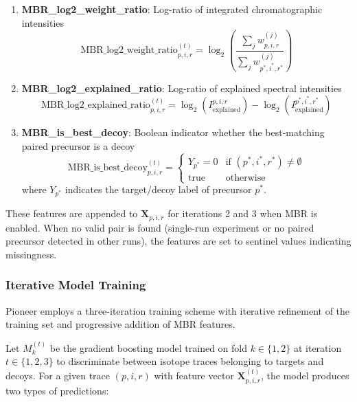 \documentclass[pdflatex,sn-nature]{sn-jnl}
\begin{document}
\begin{enumerate}
\item \textbf{MBR\_log2\_weight\_ratio}: Log-ratio of integrated chromatographic intensities
\begin{equation}
    \text{MBR\_log2\_weight\_ratio}_{p,i,r}^{(t)} = \log_2\left(\frac{\sum_j w_{p,i,r}^{(j)}}{\sum_j w_{p^*,i^*,r^*}^{(j)}}\right)
\end{equation}

\item \textbf{MBR\_log2\_explained\_ratio}: Log-ratio of explained spectral intensities
\begin{equation}
    \text{MBR\_log2\_explained\_ratio}_{p,i,r}^{(t)} = \log_2(I_{\text{explained}}^{p,i,r}) - \log_2(I_{\text{explained}}^{p^*,i^*,r^*})
\end{equation}

\item \textbf{MBR\_is\_best\_decoy}: Boolean indicator whether the best-matching paired precursor is a decoy
\begin{equation}
    \text{MBR\_is\_best\_decoy}_{p,i,r}^{(t)} = \begin{cases}
        Y_{p^*} = 0 & \text{if } (p^*,i^*,r^*) \neq \emptyset \\
        \text{true} & \text{otherwise}
    \end{cases}
\end{equation}
where $Y_{p^*}$ indicates the target/decoy label of precursor $p^*$.
\end{enumerate}

These features are appended to $\mathbf{X}_{p,i,r}$ for iterations 2 and 3 when MBR is enabled. When no valid pair is found (single-run experiment or no paired precursor detected in other runs), the features are set to sentinel values indicating missingness.

\subsubsection{Iterative Model Training}\label{subsubsec:iterative-model-training}

Pioneer employs a three-iteration training scheme with iterative refinement of the training set and progressive addition of MBR features.

Let $M_k^{(t)}$ be the gradient boosting model trained on fold $k \in \{1,2\}$ at iteration $t \in \{1,2,3\}$ to discriminate between isotope traces belonging to targets and decoys. For a given trace $(p,i,r)$ with feature vector $\mathbf{X}_{p,i,r}^{(t)}$, the model produces two types of predictions:
\end{document}
